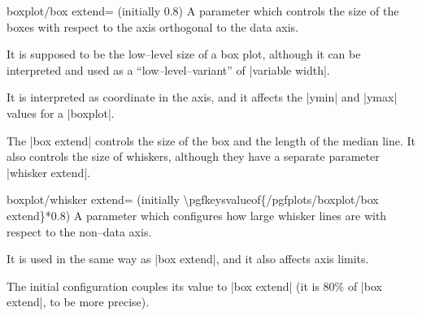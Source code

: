 \begin{pgfplotskey}{boxplot/box extend= (initially 0.8)}
	A parameter which controls the size of the boxes with respect to the axis orthogonal to the data axis. 

	It is supposed to be the low--level size of a box plot, although it can be interpreted and used as a ``low--level--variant'' of |variable width|.
	
	It is interpreted as coordinate in the axis, and it affects the |ymin| and |ymax| values for a |boxplot|.
\begin{codeexample}[]
\end{codeexample}

	The |box extend| controls the size of the box and the length of the median line. It also controls the size of whiskers, although they have a separate parameter |whisker extend|.
\end{pgfplotskey}

\begin{pgfplotskey}{boxplot/whisker extend= (initially \textbackslash pgfkeysvalueof\{/pgfplots/boxplot/box extend\}*0.8)}
	A parameter which configures how large whisker lines are with respect to the non--data axis.
	
	It is used in the same way as |box extend|, and it also affects axis limits. 

	The initial configuration couples its value to |box extend| (it is $80\%$ of |box extend|, to be more precise).
\end{pgfplotskey}


